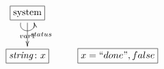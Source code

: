 $\xymatrix{
  \fbox{system} \ar@(dl,dr)[]_{var1} \ar[d]^{status} \\
  \fbox{$\mathit{string}\colon x$} & \fbox{$x = ``done", false$}
}$
